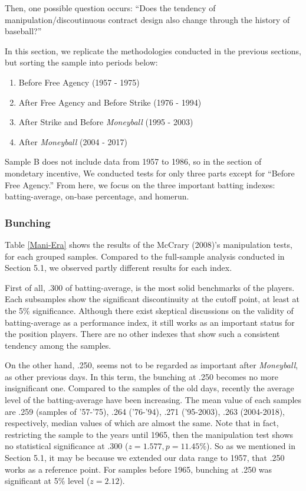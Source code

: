 \documentclass[dvipdfmx, 12pt]{article}
\begin{document}
Then, one possible question occurs: ``Does the tendency of manipulation/discoutinuous contract design also change through the history of baseball?''

In this section, we replicate the methodologies conducted in the previous sections, but sorting the sample into periods below:

\begin{enumerate}
  \item Before Free Agency (1957 - 1975)

  \item After Free Agency and Before Strike (1976 - 1994)

  \item After Strike and Before \textit{Moneyball} (1995 - 2003)

  \item After \textit{Moneyball} (2004 - 2017)
\end{enumerate}

Sample B does not include data from 1957 to 1986, so in the section of mondetary incentive, We conducted tests for only three parts except for ``Before Free Agency.'' From here, we focus on the three important batting indexes: batting-average, on-base percentage, and homerun.

\subsubsection{Bunching}

Table \ref{Mani-Era} shows the results of the McCrary (2008)'s manipulation tests, for each grouped samples. Compared to the full-sample analysis conducted in Section 5.1, we observed partly different results for each index.

First of all, .300 of batting-average, is the most solid benchmarks of the players. Each subsamples show the significant discontinuity at the cutoff point, at least at the 5\% significance. Although there exist skeptical discussions on the validity of batting-average as a performance index, it still works as an important status for the position players. There are no other indexes that show such a consistent tendency among the samples.

On the other hand, .250, seems not to be regarded as important after \textit{Moneyball}, as other previous days. In this term, the bunching at .250 becomes no more insignificant one. Compared to the samples of the old days, recently the average level of the batting-average have been increasing. The mean value of each samples are .259 (samples of '57-'75), .264 ('76-'94), .271 ('95-2003), .263 (2004-2018), respectively, median values of which are almost the same. Note that in fact, restricting the sample to the years until 1965, then the manipulation test shows no statistical significance at .300 ($z = 1.577, p = 11.45\% $). So as we mentioned in Section 5.1, it may be because we extended our data range to 1957, that .250 works as a reference point. For samples before 1965, bunching at .250 was significant at 5\% level ($z = 2.12$).
\end{document}
